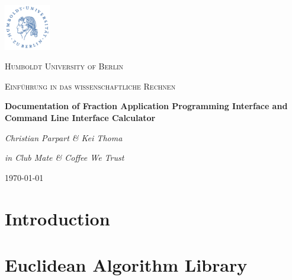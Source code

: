 \documentclass[refman]{scrartcl}
\begin{document}

\begin{titlepage}
	\centering
	\includegraphics[width=0.15\textwidth]{graphics/huberlin_logo}\par\vspace{1cm}
	{\scshape\LARGE Humboldt University of Berlin \par}
	\vspace{1cm}
	{\scshape\Large Einf{\"u}hrung in das wissenschaftliche Rechnen \par}
	\vspace{1.5cm}
	{\huge\bfseries Documentation of Fraction Application Programming Interface and Command Line Interface Calculator\par}
	\vspace{2cm}
	{\Large\itshape Christian Parpart \& Kei Thoma \par}
	\vfill
	{\small\itshape in Club Mate \& Coffee We Trust\par}

	\vfill

	{\large \today\par}
\end{titlepage}

\tableofcontents
\newpage


\section{Introduction}


\section{Euclidean Algorithm Library}
\end{document}

